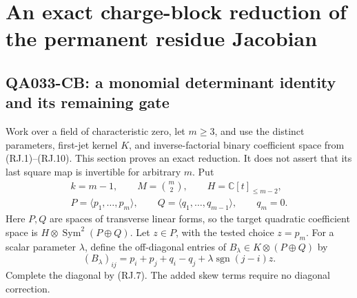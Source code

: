 \section{An exact charge-block reduction of the permanent residue Jacobian}

\subsection*{QA033-CB: a monomial determinant identity and its remaining gate}
Work over a field of characteristic zero, let \(m\geq3\), and use
the distinct parameters, first-jet kernel \(K\), and inverse-factorial
binary coefficient space from (RJ.1)--(RJ.10).
This section proves an exact reduction. It does not assert that its
last square map is invertible for arbitrary \(m\).
Put
\[
 \begin{gathered}
 k=m-1,\qquad M=\binom m2,\qquad
 H=\mathbb C[t]_{\leq m-2},\\
 P=\langle p_1,\ldots,p_m\rangle,\qquad
 Q=\langle q_1,\ldots,q_{m-1}\rangle,\qquad q_m=0.
 \end{gathered}
                                                               \tag{CB.1}
\]
Here \(P,Q\) are spaces of transverse linear forms, so the
target quadratic coefficient space is
\(H\otimes\operatorname{Sym}^2(P\oplus Q)\).
Let \(z\in P\), with the tested choice \(z=p_m\).
For a scalar parameter \(\lambda\), define the off-diagonal
entries of \(B_\lambda\in K\otimes(P\oplus Q)\) by
\[
 (B_\lambda)_{ij}=p_i+p_j+q_i-q_j
                         +\lambda\operatorname{sgn}(j-i)z.
                                                               \tag{CB.2}
\]
Complete the diagonal by (RJ.7). The added skew terms require
no diagonal correction.

